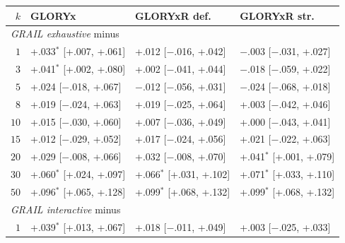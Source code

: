 \begin{table}[h]
\begin{threeparttable}
\vspace{5pt}

\begin{tabular}{rlll}
\toprule
$k$ & GLORYx & GLORYxR def. & GLORYxR str. \\
\midrule
\multicolumn{4}{l}{\emph{GRAIL exhaustive} minus} \\
$1$ & +.033$^{*}$\phantom{$^{\dagger}$} [+.007, +.061] & +.012\phantom{$^{*}$}\phantom{$^{\dagger}$} [$-$.016, +.042] & $-$.003\phantom{$^{*}$}\phantom{$^{\dagger}$} [$-$.031, +.027] \\
$3$ & +.041$^{*}$\phantom{$^{\dagger}$} [+.002, +.080] & +.002\phantom{$^{*}$}\phantom{$^{\dagger}$} [$-$.041, +.044] & $-$.018\phantom{$^{*}$}\phantom{$^{\dagger}$} [$-$.059, +.022] \\
$5$ & +.024\phantom{$^{*}$}\phantom{$^{\dagger}$} [$-$.018, +.067] & $-$.012\phantom{$^{*}$}\phantom{$^{\dagger}$} [$-$.056, +.031] & $-$.024\phantom{$^{*}$}\phantom{$^{\dagger}$} [$-$.068, +.018] \\
$8$ & +.019\phantom{$^{*}$}\phantom{$^{\dagger}$} [$-$.024, +.063] & +.019\phantom{$^{*}$}\phantom{$^{\dagger}$} [$-$.025, +.064] & +.003\phantom{$^{*}$}\phantom{$^{\dagger}$} [$-$.042, +.046] \\
$10$ & +.015\phantom{$^{*}$}\phantom{$^{\dagger}$} [$-$.030, +.060] & +.007\phantom{$^{*}$}\phantom{$^{\dagger}$} [$-$.036, +.049] & +.000\phantom{$^{*}$}\phantom{$^{\dagger}$} [$-$.043, +.041] \\
$15$ & +.012\phantom{$^{*}$}\phantom{$^{\dagger}$} [$-$.029, +.052] & +.017\phantom{$^{*}$}\phantom{$^{\dagger}$} [$-$.024, +.056] & +.021\phantom{$^{*}$}\phantom{$^{\dagger}$} [$-$.022, +.063] \\
$20$ & +.029\phantom{$^{*}$}\phantom{$^{\dagger}$} [$-$.008, +.066] & +.032\phantom{$^{*}$}\phantom{$^{\dagger}$} [$-$.008, +.070] & +.041$^{*}$\phantom{$^{\dagger}$} [+.001, +.079] \\
$30$ & +.060$^{*}$\phantom{$^{\dagger}$} [+.024, +.097] & +.066$^{*}$\phantom{$^{\dagger}$} [+.031, +.102] & +.071$^{*}$\phantom{$^{\dagger}$} [+.033, +.110] \\
$50$ & +.096$^{*}$\phantom{$^{\dagger}$} [+.065, +.128] & +.099$^{*}$\phantom{$^{\dagger}$} [+.068, +.132] & +.099$^{*}$\phantom{$^{\dagger}$} [+.068, +.132] \\
\midrule
\multicolumn{4}{l}{\emph{GRAIL interactive} minus} \\
$1$ & +.039$^{*}$\phantom{$^{\dagger}$} [+.013, +.067] & +.018\phantom{$^{*}$}\phantom{$^{\dagger}$} [$-$.011, +.049] & +.003\phantom{$^{*}$}\phantom{$^{\dagger}$} [$-$.025, +.033] \\

\end{tabular}
\end{threeparttable}
\end{table}
